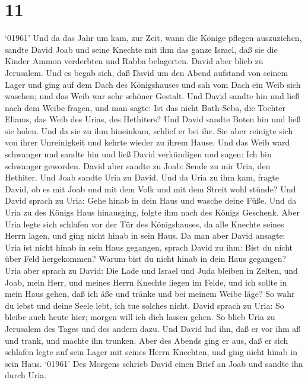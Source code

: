 \hypertarget{section-10}{%
\section{11}\label{section-10}}

 `01961' Und da das Jahr um kam, zur Zeit, wann die Könige
pflegen auszuziehen, sandte David Joab und seine Knechte mit ihm das
ganze Israel, daß sie die Kinder Ammon verderbten und Rabba belagerten.
David aber blieb zu Jerusalem.  Und es begab sich, daß David
um den Abend aufstand von seinem Lager und ging auf dem Dach des
Königshauses und sah vom Dach ein Weib sich waschen; und das Weib war
sehr schöner Gestalt.  Und David sandte hin und ließ nach
dem Weibe fragen, und man sagte: Ist das nicht Bath-Seba, die Tochter
Eliams, das Weib des Urias, des Hethiters?  Und David sandte
Boten hin und ließ sie holen. Und da sie zu ihm hineinkam, schlief er
bei ihr. Sie aber reinigte sich von ihrer Unreinigkeit und kehrte wieder
zu ihrem Hause.  Und das Weib ward schwanger und sandte hin
und ließ David verkündigen und sagen: Ich bin schwanger geworden.
 David aber sandte zu Joab: Sende zu mir Uria, den Hethiter.
Und Joab sandte Uria zu David.  Und da Uria zu ihm kam,
fragte David, ob es mit Joab und mit dem Volk und mit dem Streit wohl
stünde?  Und David sprach zu Uria: Gehe hinab in dein Haus
und wasche deine Füße. Und da Uria zu des Königs Haus hinausging, folgte
ihm nach des Königs Geschenk.  Aber Uria legte sich schlafen
vor der Tür des Königshauses, da alle Knechte seines Herrn lagen, und
ging nicht hinab in sein Haus.  Da man aber David ansagte:
Uria ist nicht hinab in sein Haus gegangen, sprach David zu ihm: Bist du
nicht über Feld hergekommen? Warum bist du nicht hinab in dein Haus
gegangen?  Uria aber sprach zu David: Die Lade und Israel
und Juda bleiben in Zelten, und Joab, mein Herr, und meines Herrn
Knechte liegen im Felde, und ich sollte in mein Haus gehen, daß ich äße
und tränke und bei meinem Weibe läge? So wahr du lebst und deine Seele
lebt, ich tue solches nicht.  David sprach zu Uria: So
bleibe auch heute hier; morgen will ich dich lassen gehen. So blieb Uria
zu Jerusalem des Tages und des andern dazu.  Und David lud
ihn, daß er vor ihm aß und trank, und machte ihn trunken. Aber des
Abends ging er aus, daß er sich schlafen legte auf sein Lager mit seines
Herrn Knechten, und ging nicht hinab in sein Haus.  `01961'
Des Morgens schrieb David einen Brief an Joab und sandte ihn durch Uria.
